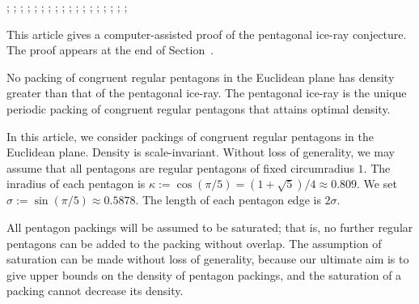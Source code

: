 {
;  %
;  %
;  
;  %
; 
;  
;  
;  %
; 
;  
;  
;  %
;  %
; 
;  %
; 
;  
;   
}



This article gives a computer-assisted proof of the pentagonal ice-ray
conjecture.  The proof appears at the end of Section~.


\begin{theorem}  
  No packing of congruent regular pentagons in the Euclidean plane has
  density greater than that of the pentagonal ice-ray.  The pentagonal
  ice-ray is the unique periodic packing of congruent regular
  pentagons that attains optimal density.
\end{theorem}

In this article, we consider packings of congruent regular pentagons in
the Euclidean plane.   Density is scale-invariant.  Without loss of generality,
we may assume that all pentagons are regular pentagons of fixed
circumradius $1$.  The inradius of each pentagon is $\kappa:= \cos
(\pi/5) = (1+\sqrt{5})/4 \approx 0.809$. We set $\sigma := \sin(\pi/5)
\approx 0.5878$.  The length of each pentagon edge is $2\sigma$.

All pentagon packings will be assumed to be saturated; that is, no
further regular pentagons can be added to the packing without overlap.
The assumption of saturation can be made without loss of generality,
because our ultimate aim is to give upper bounds on the density of
pentagon packings, and the saturation of a packing cannot decrease its
density.

